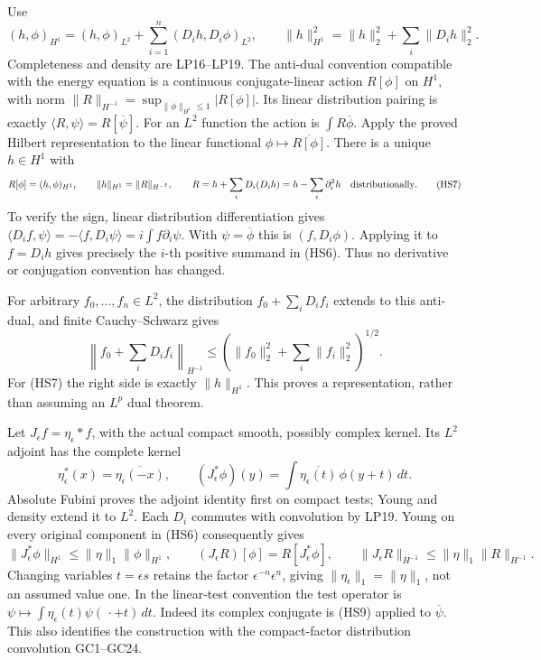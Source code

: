 \documentclass[
  11pt,
]{article}
\begin{document}
Use \[
 (h,\phi)_{H^1}=(h,\phi)_{L^2}
                   +\sum_{i=1}^n(D_i h,D_i\phi)_{L^2},\qquad
 \|h\|_{H^1}^2=\|h\|_2^2+\sum_i\|D_i h\|_2^2.                 \tag{HS6}
\] Completeness and density are LP16--LP19. The anti-dual convention
compatible with the energy equation is a continuous conjugate-linear
action \(R[\phi]\) on \(H^1\), with norm
\(\|R\|_{H^{-1}}=\sup_{\|\phi\|_{H^1}\leq1}|R[\phi]|\). Its linear
distribution pairing is exactly
\(\langle R,\psi\rangle=R[\overline\psi]\). For an \(L^2\) function the
action is \(\int R\overline\phi\). Apply the proved Hilbert
representation to the linear functional
\(\phi\mapsto\overline{R[\phi]}\). There is a unique \(h\in H^1\) with
\[
 R[\phi]=(h,\phi)_{H^1},\qquad
 \|h\|_{H^1}=\|R\|_{H^{-1}},\qquad
 R=h+\sum_iD_i(D_i h)
       =h-\sum_i\partial_i^2h\quad\hbox{distributionally}.       \tag{HS7}
\] To verify the sign, linear distribution differentiation gives
\(\langle D_i f,\psi\rangle=-\langle f,D_i\psi\rangle
=i\int f\partial_i\psi\). With \(\psi=\overline\phi\) this is
\((f,D_i\phi)\). Applying it to \(f=D_i h\) gives precisely the \(i\)-th
positive summand in (HS6). Thus no derivative or conjugation convention
has changed.

For arbitrary \(f_0,\ldots,f_n\in L^2\), the distribution
\(f_0+\sum_iD_i f_i\) extends to this anti-dual, and finite
Cauchy--Schwarz gives \[
 \left\|f_0+\sum_iD_i f_i\right\|_{H^{-1}}
       \leq\left(\|f_0\|_2^2+\sum_i\|f_i\|_2^2\right)^{1/2}.     \tag{HS8}
\] For (HS7) the right side is exactly \(\|h\|_{H^1}\). This proves a
representation, rather than assuming an \(L^p\) dual theorem.

Let \(J_\epsilon f=\eta_\epsilon*f\), with the actual compact smooth,
possibly complex kernel. Its \(L^2\) adjoint has the complete kernel \[
 \eta_\epsilon^*(x)=\overline{\eta_\epsilon(-x)},\qquad
 (J_\epsilon^*\phi)(y)
       =\int\overline{\eta_\epsilon(t)}\,\phi(y+t)\,dt .          \tag{HS9}
\] Absolute Fubini proves the adjoint identity first on compact tests;
Young and density extend it to \(L^2\). Each \(D_i\) commutes with
convolution by LP19. Young on every original component in (HS6)
consequently gives \[
 \|J_\epsilon^*\phi\|_{H^1}
       \leq\|\eta\|_1\|\phi\|_{H^1},\qquad
 (J_\epsilon R)[\phi]=R[J_\epsilon^*\phi],\qquad
 \|J_\epsilon R\|_{H^{-1}}\leq\|\eta\|_1\|R\|_{H^{-1}}.          \tag{HS10}
\] Changing variables \(t=\epsilon s\) retains the factor
\(\epsilon^{-n}\epsilon^n\), giving \(\|\eta_\epsilon\|_1=\|\eta\|_1\),
not an assumed value one. In the linear-test convention the test
operator is \(\psi\mapsto\int\eta_\epsilon(t)\psi(\,\cdot+t)\,dt\).
Indeed its complex conjugate is (HS9) applied to \(\overline\psi\). This
also identifies the construction with the compact-factor distribution
convolution GC1--GC24.
\end{document}

